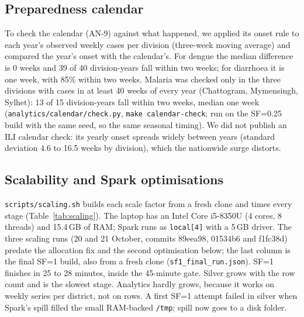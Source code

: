 \subsection{Preparedness calendar}
To check the calendar (AN-9) against what happened, we applied its onset rule to each year's observed weekly
cases per division (three-week moving average) and compared the year's onset with the calendar's. For dengue
the median difference is 0 weeks and 39 of 40 division-years fall within two weeks; for diarrhoea it is one
week, with 85\% within two weeks. Malaria was checked only in the three divisions with cases in at least 40
weeks of every year (Chattogram, Mymensingh, Sylhet): 13 of 15 division-years fall within two weeks, median one
week (\texttt{analytics/calendar/check.py}, \texttt{make calendar-check}; run on the SF=0.25 build with the
same seed, so the same seasonal timing). We did not publish an ILI calendar check:
its yearly onset spreads widely between years (standard deviation 4.6 to 16.5 weeks by division), which the nationwide surge distorts.

\subsection{Scalability and Spark optimisations}
\texttt{scripts/scaling.sh} builds each scale factor from a fresh clone and times every stage
(Table~\ref{tab:scaling}). The laptop has an Intel Core i5-8350U (4 cores, 8 threads) and 15.4\,GB of RAM;
Spark runs as \texttt{local[4]} with a 5\,GB driver. The three scaling runs (20 and 21 October, commits 89eea98, 01534b6
and f1fc38d) predate the allocation fix and the second optimisation below; the last column is the final SF=1 build, also from a fresh
clone (\texttt{sf1\_final\_run.json}). SF=1 finishes in 25 to 28 minutes, inside the 45-minute gate. Silver
grows with the row count and is the slowest stage. Analytics hardly grows, because it works on weekly series
per district, not on rows. A first SF=1 attempt failed in silver when Spark's spill filled the small
RAM-backed \texttt{/tmp}; spill now goes to a disk folder.

